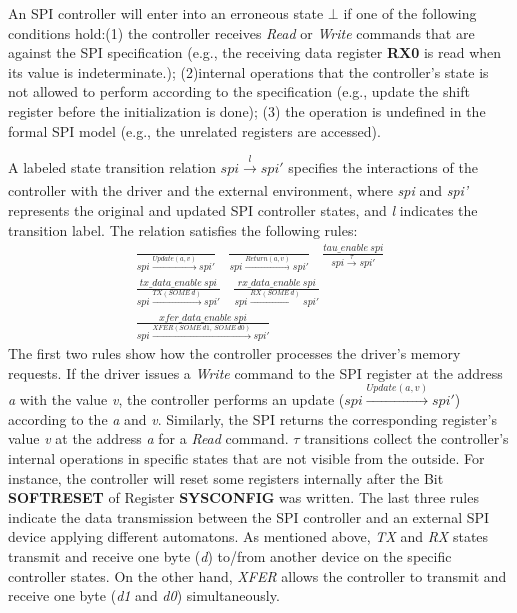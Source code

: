 \documentclass[runningheads]{llncs}
\begin{document}
An SPI controller will enter into an erroneous state $\bot$ if one of the following conditions hold:(1) the controller receives \textit{Read} or \textit{Write} commands that are against the SPI specification\cite{am335x} (e.g., the receiving data register \textbf{RX0} is read when its value is indeterminate.);
(2)internal operations that the controller's state is not allowed to perform according to the specification (e.g., update the shift register before the initialization is done); 
(3) the operation is undefined in the formal SPI model (e.g., the unrelated registers are accessed).

A labeled state transition relation $spi \xrightarrow[]{l} spi' $ specifies the interactions of the controller with the driver and the external environment, where \textit{spi} and \textit{spi'} represents the original and updated SPI controller states, and \textit{l} indicates the transition label. 
The relation satisfies the following rules:
\begin{gather*}
    \frac{}{spi \xrightarrow{Update(a,v)} spi'} \ \ \ \ 
    \frac{}{spi \xrightarrow{Return(a,v)} spi'} \ \ \ \
    \frac{tau\_enable\ spi}{spi \xrightarrow{\tau} spi'} \\
    \frac{tx\_data\_enable\ spi}{spi \xrightarrow{TX (SOME\ d)} spi'} \ \ \ \ 
    \frac{rx\_data\_enable\ spi}{spi \xrightarrow{RX (SOME\ d)} spi'}\\
    \frac{xfer\_data\_enable\ spi}{spi \xrightarrow{XFER (SOME\ d1,\ SOME\ d0)} spi'}
\end{gather*}
The first two rules show how the controller processes the driver's memory requests. 
If the driver issues a \textit{Write} command to the SPI register at the address \textit{a} with the value \textit{v}, the controller performs an update ($spi \xrightarrow{Update(a,v)} spi'$) according to the \textit{a} and \textit{v}. 
Similarly, the SPI returns the corresponding register's value \textit{v} at the address \textit{a} for a \textit{Read} command. 
$\tau$ transitions collect the controller's internal operations in specific states that are not visible from the outside. 
For instance, the controller will reset some registers internally after the Bit \textbf{SOFTRESET} of Register \textbf{SYSCONFIG} was written. 
The last three rules indicate the data transmission between the SPI controller and an external SPI device applying different automatons. 
As mentioned above, \textit{TX} and \textit{RX} states transmit and receive one byte (\textit{d}) to/from another device on the specific controller states. 
On the other hand, \textit{XFER} allows the controller to transmit and receive one byte (\textit{d1} and \textit{d0}) simultaneously. 
\end{document}
